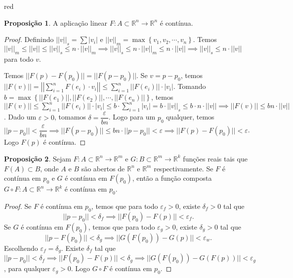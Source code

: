 \documentclass[12pt,leqno,twoside]{amsart}
\theoremstyle{definition}
\newtheorem{proposicao}{Proposição}[section]
\begin{document}
\begin{color}{red}
\begin{proposicao}
	A aplicação linear $F:A\subset \mathbb{R}^n \to \mathbb{R}^n $ é contínua.
\end{proposicao}
\begin{proof}

	Definindo $|| v ||_s = \sum |v_i|$ e $ || v||_{m} = \max \left\{ v_1,v_2,\cdots,v_n \right\}$. Temos $||v||_m \leq ||v || \leq || v||_s \leq n\cdot ||v||_m \implies || v ||_s \leq n\cdot ||v||_m \leq n\cdot || v || \implies ||v||_s \leq n \cdot ||v||   $ para todo $v$.

		Temos $|| F(p) - F(p_0) || = || F(p -p_0) ||$. Se $v = p-p_0$, temos $|| F(v)|| = \left| \left| \displaystyle\sum_{i=1}^{n} F(e_i) \cdot v_i \right|\right| \leq   \displaystyle\sum_{i=1}^{n}  \left| \left| F(e_i)  \right|\right| \cdot | v_i | $. Tomando $b = \max\left\{ || F(e_1) || , || F(e_2) ||,\cdots, || F(e_n)|| \right\}$, temos $|| F(v)|| \leq   \displaystyle\sum_{i=1}^{n}  \left| \left| F(e_i)  \right|\right| \cdot | v_i | \leq b\cdot \displaystyle\sum_{i=1}^{n} | v_i | = b\cdot || v||_s \leq b\cdot n \cdot || v||  \implies ||F(v)|| \leq bn \cdot ||v||  $. Dado um $\varepsilon>0$, tomamos $\delta = \dfrac{\varepsilon}{bn}$. Logo para um $p_0$ qualquer, temos  $ || p -p_0|| < \dfrac{\varepsilon}{bn}  \implies ||F(p-p_0)|| \leq bn\cdot || p - p_0|| < \varepsilon \implies ||F(p) - F(p_0)|| < \varepsilon$.  Logo $F(p)$ é contínua.
\end{proof}

\vspace{0.3cm}

\begin{proposicao}
	Sejam $F:A\subset\mathbb{R}^n\to \mathbb{R}^m$ e $G:B\subset\mathbb{R}^m\to \mathbb{R}^k$ funções reais tais que $F(A)\subset B$, onde $A$ e $B$ são abertos de $\mathbb{R}^n$ e $\mathbb{R}^m$ respectivamente. Se $F$ é contínua em $p_0$ e $G$ é contínua em $F(p_0)$, então a função composta $G \circ F: A \subset \mathbb{R}^n \to \mathbb{R}^k$ é contínua em $p_0$.
\end{proposicao}
\begin{proof}
	Se $F$ é contínua em $p_0$, temos que para todo $\varepsilon_f>0$, existe $\delta_f>0$ tal que  $$|| p-p_0 || <\delta_f \implies || F(p_0) - F(p) || < \varepsilon_f.$$
	Se $G$ é contínua em $F(p_0)$, temos que para todo $\varepsilon_g>0$, existe $\delta_g>0$ tal que  $$|| p-F(p_0) || <\delta_g \implies || G(F(p_0)) - G(p) || < \varepsilon_w .$$
	Escolhendo $\varepsilon_f = \delta_g$. Existe $\delta_f$ tal que $|| p-p_0 || <\delta_f \implies || F(p_0) - F(p) || < \delta_g \implies ||G(F(p_0)) - G(F(p))|| < \varepsilon_g$, para qualquer $\varepsilon_g>0$. Logo $G\circ F$ é contínua em $p_0$.
\end{proof}


\end{color}
\end{document}
